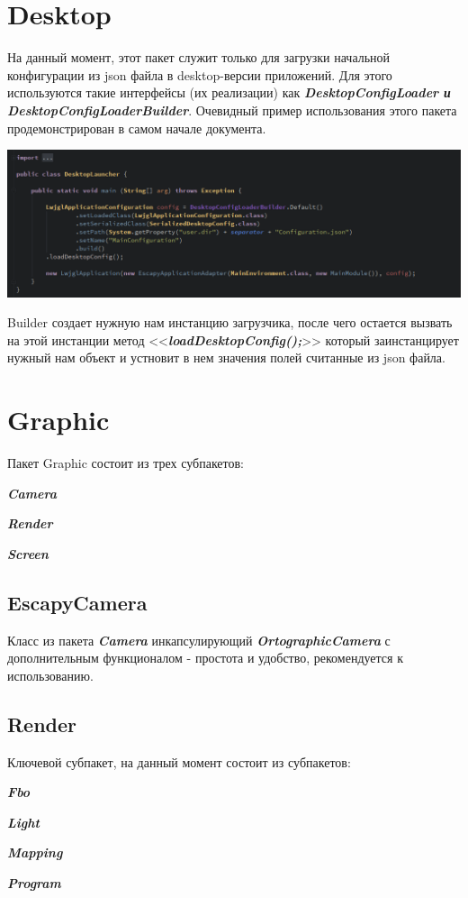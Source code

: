 \documentclass[11pt]{report}
\newenvironment{itemize*}%
  {\begin{itemize}%
    \setlength{\itemsep}{2pt}%
    \setlength{\parskip}{0.75pt}}%
  {\end{itemize}}
\begin{document}
\chapter{Desktop}
На данный момент, этот пакет служит только для загрузки начальной конфигурации из json файла в desktop-версии приложений. Для этого используются такие интерфейсы (их реализации) как \textit{\textbf{DesktopConfigLoader и DesktopConfigLoaderBuilder}}. Очевидный пример использования этого пакета продемонстрирован в самом начале документа.
\begin{center}
	\includegraphics[width=1.25\linewidth]{img/1.png} 
  	\label{img:9}
\end{center}
Builder создает нужную нам инстанцию загрузчика, после чего остается вызвать на этой инстанции метод <<\textit{\textbf{loadDesktopConfig();}}>> который заинстанцирует нужный нам объект и устновит в нем значения полей считанные из json файла.

\chapter{Graphic}
Пакет Graphic состоит из трех субпакетов: \begin{itemize*}
	\item \textit{\textbf{Camera}}
	\item \textit{\textbf{Render}}
	\item \textit{\textbf{Screen}}
\end{itemize*}
\section{EscapyCamera}
Класс из пакета \textit{\textbf{Camera}} инкапсулирующий \textit{\textbf{OrtographicCamera}} с дополнительным функционалом - простота и удобство, рекомендуется к использованию.

\section{Render}
Ключевой субпакет, на данный момент состоит из субпакетов: \begin{itemize*}
	\item \textit{\textbf{Fbo}}
	\item \textit{\textbf{Light}}
	\item \textit{\textbf{Mapping}}
	\item \textit{\textbf{Program}}
	\\
\end{itemize*}
\end{document}

